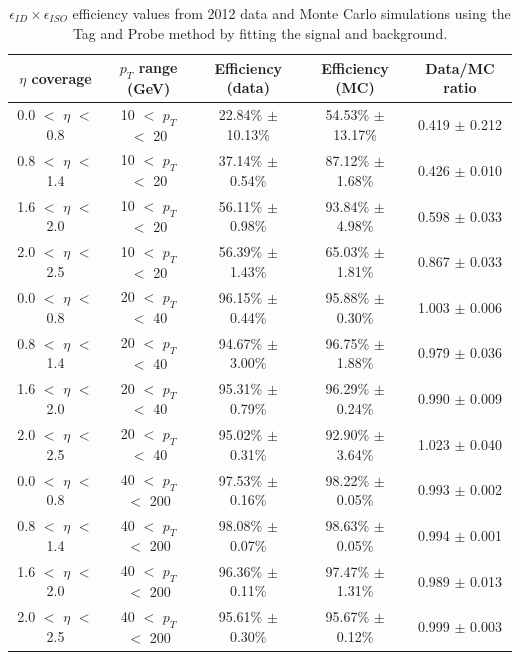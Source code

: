 \begin{table}[htb]
\caption{%
    $\epsilon_{ID} \times \epsilon_{ISO}$ efficiency values from 2012 data and Monte Carlo simulations using the Tag and Probe method by fitting the signal and background.
}
\begin{center}
\begin{tabular}{ | c | c | c | c | c |}
      \hline
      $\eta$ coverage & $p_T$ range (GeV) & Efficiency (data) & Efficiency (MC) & Data/MC ratio \\ \hline \hline
     0.0 $<$ $\eta$ $<$ 0.8 & 10 $<$ $p_T$ $<$ 20 & 22.84\% $\pm$ 10.13\% & 54.53\% $\pm$ 13.17\% & 0.419 $\pm$ 0.212 \\ \hline
     0.8 $<$ $\eta$ $<$ 1.4 & 10 $<$ $p_T$ $<$ 20 & 37.14\% $\pm$ 0.54\% & 87.12\% $\pm$ 1.68\% & 0.426 $\pm$ 0.010 \\ \hline
     1.6 $<$ $\eta$ $<$ 2.0 & 10 $<$ $p_T$ $<$ 20 & 56.11\% $\pm$ 0.98\% & 93.84\% $\pm$ 4.98\% & 0.598 $\pm$ 0.033 \\ \hline
     2.0 $<$ $\eta$ $<$ 2.5 & 10 $<$ $p_T$ $<$ 20 & 56.39\% $\pm$ 1.43\% & 65.03\% $\pm$ 1.81\% & 0.867 $\pm$ 0.033 \\ \hline
     \hline
     0.0 $<$ $\eta$ $<$ 0.8 & 20 $<$ $p_T$ $<$ 40 & 96.15\% $\pm$ 0.44\% & 95.88\% $\pm$ 0.30\% & 1.003 $\pm$ 0.006 \\ \hline
     0.8 $<$ $\eta$ $<$ 1.4 & 20 $<$ $p_T$ $<$ 40 & 94.67\% $\pm$ 3.00\% & 96.75\% $\pm$ 1.88\% & 0.979 $\pm$ 0.036 \\ \hline
     1.6 $<$ $\eta$ $<$ 2.0 & 20 $<$ $p_T$ $<$ 40 & 95.31\% $\pm$ 0.79\% & 96.29\% $\pm$ 0.24\% & 0.990 $\pm$ 0.009 \\ \hline
     2.0 $<$ $\eta$ $<$ 2.5 & 20 $<$ $p_T$ $<$ 40 & 95.02\% $\pm$ 0.31\% & 92.90\% $\pm$ 3.64\% & 1.023 $\pm$ 0.040 \\ \hline
     \hline
     0.0 $<$ $\eta$ $<$ 0.8 & 40 $<$ $p_T$ $<$ 200 & 97.53\% $\pm$ 0.16\% & 98.22\% $\pm$ 0.05\% & 0.993 $\pm$ 0.002 \\ \hline
     0.8 $<$ $\eta$ $<$ 1.4 & 40 $<$ $p_T$ $<$ 200 & 98.08\% $\pm$ 0.07\% & 98.63\% $\pm$ 0.05\% & 0.994 $\pm$ 0.001 \\ \hline
     1.6 $<$ $\eta$ $<$ 2.0 & 40 $<$ $p_T$ $<$ 200 & 96.36\% $\pm$ 0.11\% & 97.47\% $\pm$ 1.31\% & 0.989 $\pm$ 0.013 \\ \hline
     2.0 $<$ $\eta$ $<$ 2.5 & 40 $<$ $p_T$ $<$ 200 & 95.61\% $\pm$ 0.30\% & 95.67\% $\pm$ 0.12\% & 0.999 $\pm$ 0.003 \\ \hline
    \end{tabular}
\end{center}
\label{tab:tagandprobe_ISO}
\end{table}


